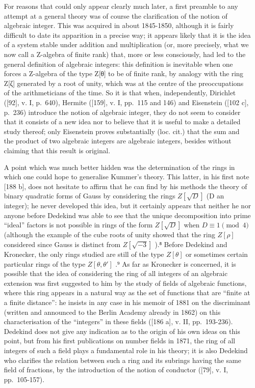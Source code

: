 For reasons that could only appear clearly much later, a first preamble to any attempt at a general theory was of course the clarification of the notion of algebraic integer. This was acquired in about 1845-1850, although it is fairly difficult to date its apparition in a precise way; it appears likely that it is the idea of a system stable under addition and multiplication (or, more precisely, what we now call a Z-algebra of finite rank) that, more or less consciously, had led to the general definition of algebraic integers: this definition is inevitable when one forces a Z-algebra of the type Z{[}θ{]} to be of finite rank, by analogy with the ring Z{[}ζ{]} generated by a root of unity, which was at the centre of the preoccupations of the arithmeticians of the time. So it is that when, independently, Dirichlet ({[}92{]}, v. I, p.~640), Hermite ({[}159{]}, v. I, pp.~115 and 146) and Eisenstein ({[}102 c{]}, p.~236) introduce the notion of algebraic integer, they do not seem to consider that it consists of a new idea nor to believe that it is useful to make a detailed study thereof; only Eisenstein proves substantially (loc. cit.) that the sum and the product of two algebraic integers are algebraic integers, besides without claiming that this result is original.

A point which was much better hidden was the determination of the rings in which one could hope to generalise Kummer's theory. This latter, in his first note {[}188 b{]}, does not hesitate to affirm that he can find by his methods the theory of binary quadratic forms of Gauss by considering the rings \(Z[\sqrt{D}]\) (D an integer); he never developed this idea, but it certainly appears that neither he nor anyone before Dedekind was able to see that the unique decomposition into prime ``ideal'' factors is not possible in rings of the form \(Z[\sqrt{D}]\) when \(D \equiv 1 \pmod{4}\) (although the example of the cube roots of unity showed that the ring \(Z[\rho]\) considered since Gauss is distinct from \(Z[\sqrt{-3}]\) ).⁸ Before Dedekind and Kronecker, the only rings studied are still of the type \(Z[\theta]\) or sometimes certain particular rings of the type \(Z[\theta, \theta']\) .⁹ As far as Kronecker is concerned, it is possible that the idea of considering the ring of all integers of an algebraic extension was first suggested to him by the study of fields of algebraic functions, where this ring appears in a natural way as the set of functions that are ``finite at a finite distance'': he insists in any case in his memoir of 1881 on the discriminant (written and announced to the Berlin Academy already in 1862) on this characterisation of the ``integers'' in these fields ({[}186 a{]}, v. II, pp.~193-236). Dedekind does not give any indication as to the origin of his own ideas on this point, but from his first publications on number fields in 1871, the ring of all integers of such a field plays a fundamental role in his theory; it is also Dedekind who clarifies the relation between such a ring and its subrings having the same field of fractions, by the introduction of the notion of conductor ({[}79{]}, v. I, pp.~105-157).

